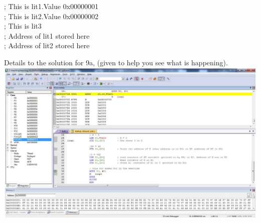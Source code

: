 \documentclass[10pt]{article}
\begin{document}
; This is lit1.Value 0x00000001\\
; This is lit2.Value 0x00000002\\
; This is lit3\\
; Address of lit1 stored here\\
; Address of lit2 stored here

Details to the solution for 9a, (given to help you see what is happening).\\
\includegraphics[max width=\textwidth, center]{2025_01_02_eeffad754b73de6041b6g-10}
\end{document}

